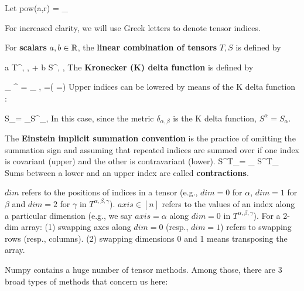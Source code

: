 Let
\beq
pow(a,r) = \underbrace{[a, a, \ldots, a]}_{}
\eeq

For increased clarity,
we will use Greek
letters to denote tensor indices.


For {\bf scalars} $a,b\in{ \mathbb{R}}$, the {\bf linear combination of tensors} $T, S$ is defined by



\rarrow a T^{\alpha, \beta, \gamma} + b S^{\alpha, \beta, \gamma}
\eeq
The {\bf Kronecker (K) delta function} is defined by

\beq
\delta_{
\alpha}^{\beta} = \delta_{
\alpha, \beta} =\indi(
\alpha=\beta)
\eeq
Upper indices can be lowered by means of the K delta function :

\beq
S_\beta = \sum_\alpha S^\alpha \delta_{\alpha,\beta}
\eeq
In this case, since the metric $\delta_{\alpha, \beta}$ is the K delta function, $S^{\alpha} =S_\alpha$.

The {\bf Einstein implicit summation convention} is the
practice of omitting the summation sign and assuming  that repeated indices are summed over if
one index is covariant (upper)
and the other is contravariant (lower).
\beq
S^\alpha T_\alpha = \sum_\alpha
S^\alpha T_\alpha
\eeq
Sums between a lower and an upper index are called {\bf contractions}.

$dim$
 refers to the positions
 of indices in a tensor (e.g., $dim=0$ for $\alpha$, $dim=1$ for $\beta$ and
 $dim=2$ for $\gamma$ in $T^{\alpha, \beta, \gamma}$).
$axis\in [n]$
refers to the values of an index  along a
particular dimension
(e.g., we say $axis=\alpha$ along $dim=0$ in $T^{\alpha, \beta, \gamma}$).
 For a 2-dim array: (1)
  swapping axes along $dim=0$ (resp., $dim=1$) refers
 to swapping rows
 (resp., columns).
 (2)
 swapping dimensions 0 and 1 means transposing the array.


Numpy contains a huge number of tensor methods.
Among those, there are 3 broad types of methods that concern us here:

